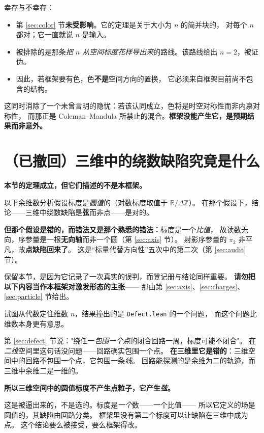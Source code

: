 \documentclass[11pt,a4paper]{article}
\theoremstyle{sudef}
\begin{document}
幸存与不幸存：

\begin{itemize}[leftmargin=1.6em]
\item 第 \ref{sec:color} 节\textbf{未受影响}。它的定理是关于大小为 $n$ 的简并块的，
      对每个 $n$ 都对；它一直就说 $n$ 是输入。
\item 被排除的是那条\emph{把 $n$ 从空间标度花样导出来}的路线。该路线给出 $n=2$，被证伪。
\item 因此，若框架要有色，色\textbf{不是}空间方向的置换，
      它必须来自框架目前尚不包含的结构。
\end{itemize}

这同时消除了一个未曾言明的隐忧：若该认同成立，色将是时空对称性而非内禀对称性，
而那正是 Coleman--Mandula 所禁止的混合。\textbf{框架没能产生它，是预期结果而非意外。}

\clearpage
\section{（已撤回）三维中的绕数缺陷究竟是什么}\label{sec:codim}

\begin{mdframed}[linecolor=red!60!black,linewidth=1.2pt,backgroundcolor=red!4]
\textbf{本节的定理成立，但它们描述的不是本框架。}

以下余维数分析假设标度是\emph{圆值}的（对数标度取值于 $\mathbb R/\Delta\mathbb Z$）。
在那个假设下，结论——三维中绕数缺陷是\textbf{弦}而非点——是对的。

\textbf{但那个假设是错的，而错法又是那个熟悉的错法：}标度是一个\emph{比值}，
故读数无向，序参量是一根\textbf{无向轴}而非一个圆（第 \ref{sec:axis} 节）。
射影序参量的 $\pi_2$ 非平凡，故\textbf{点缺陷回来了}。
这是“标量代替方向性”五次中的第二次（第 \ref{sec:audit} 节）。

保留本节，是因为它记录了一次真实的误判，而登记册与结论同样重要。
\textbf{请勿把以下内容当作本框架对激发形态的主张}——
那由第 \ref{sec:axis}、\ref{sec:charges}、\ref{sec:particle} 节给出。
\end{mdframed}

试图从代数定住维数 $n$，结果撞出的是 \texttt{Defect.lean} 的一个问题，
而这个问题比维数本身更有意思。

第 \ref{sec:defect} 节说："绕任一\emph{包围一个点}的闭合回路一周，标度可能不闭合"。
在\emph{二维}空间里这句话没问题——回路确实包围一个点。
\textbf{在三维里它是错的}：三维空间中的回路不包围一个点，它包围一条\emph{线}。
回路能探测的是余维为二的轨迹，而三维中余维二是一维的。

\begin{mdframed}[linecolor=red!60!black,linewidth=0.9pt,backgroundcolor=red!3]
\textbf{所以三维空间中的圆值标度不产生点粒子，它产生\emph{弦}。}

这是被逼出来的，不是选的。标度是\emph{一个}数——一个比值——
所以它定义的场是圆值的，其缺陷由回路分类。
框架里没有第二个标度可以让缺陷在三维中成为点。
这个结论要么被接受，要么框架得改。
\end{mdframed}
\end{document}
